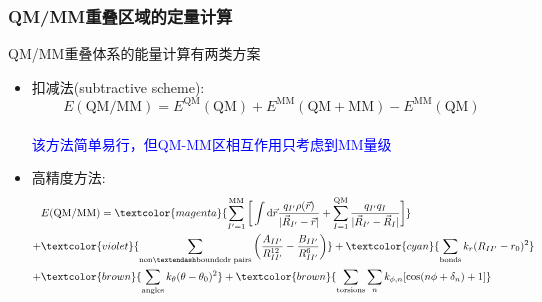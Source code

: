 \begin{frame}[allowframebreaks]
	\frametitle{\textrm{QM/MM}重叠区域的定量计算}
	\textrm{QM/MM}重叠体系的能量计算有两类方案
	\begin{itemize}
		\item 扣减法\textrm{(subtractive scheme)}:
			\begin{displaymath}
				E(\mathrm{QM/MM})=E^{\mathrm{QM}}(\mathrm{QM})+E^{\mathrm{MM}}(\mathrm{QM}+\mathrm{MM})-E^{\mathrm{MM}}(\mathrm{QM})
			\end{displaymath}
			{\fontsize{8.0pt}{4.2pt}}\\
			\textcolor{blue}{该方法简单易行，但\textrm{QM}-\textrm{MM}区相互作用只考虑到\textrm{MM}量级}
		\item 高精度方法:
			\begin{displaymath}
				\begin{aligned}
					&E(\mathrm{QM/MM})=\textcolor{magenta}{\sum_{I^{\prime}=1}^{\mathrm{MM}}\bigg[\int\mathrm{d}\vec r\dfrac{q_{I^{\prime}}\rho(\vec r)}{|\vec R_{I^{\prime}}-\vec r|}+\sum_{I=1}^{\mathrm{QM}}\dfrac{q_{I^{\prime}}q_{I}}{|\vec R_{I^{\prime}}-\vec R_I|}\bigg]}\\
					+&\textcolor{violet}{\sum_{\mathrm{\fontsize{5.0pt}{2.0pt}\selectfont{non\textendash boundedr~pairs}}}\bigg(\dfrac{A_{II^{\prime}}}{R_{II^{\prime}}^{12}}-\dfrac{B_{II^{\prime}}}{R_{II^{\prime}}^6}\bigg)}+\textcolor{cyan}{\sum_{\mathrm{bonds}}k_r(R_{II^{\prime}}-r_0)^2}\\
					+&\textcolor{brown}{\sum_{\mathrm{angles}}k_{\theta}(\theta-\theta_0)^2}+\textcolor{brown}{\sum_{\mathrm{torsions}}\sum_nk_{\phi,n}[\cos(n\phi+\delta_n)+1]}
				\end{aligned}
			\end{displaymath}
			{\fontsize{8.0pt}{4.2pt}}
			\begin{enumerate}
				{\fontsize{7.0pt}{4.2pt}}\\
					{\fontsize{6.0pt}{4.2pt}}
			\end{enumerate}
	\end{itemize}
\end{frame}

